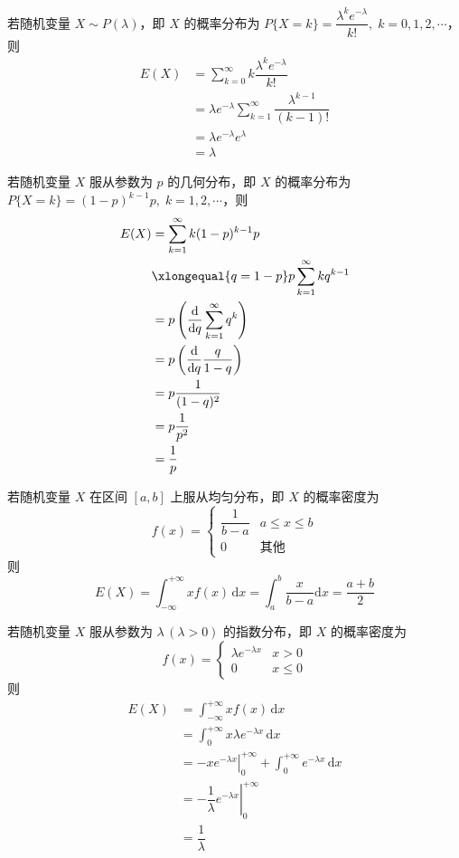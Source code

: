 若随机变量 $X \sim P(\lambda)$，即 $X$ 的概率分布为 $P\{X=k\} = \dfrac{\lambda^k e^{-\lambda}}{k!}, \; k=0,1,2,\cdots$，则
$$
\begin{aligned}
    E(X) &= \sum_{k=0}^{\infty} k \dfrac{\lambda^k e^{-\lambda}}{k!} \\
    &= \lambda e^{-\lambda} \sum_{k=1}^{\infty} \dfrac{\lambda^{k-1}}{(k-1)!} \\
    &= \lambda e^{-\lambda} e^{\lambda} \\
    &= \lambda
\end{aligned}
$$

若随机变量 $X$ 服从参数为 $p$ 的几何分布，即 $X$ 的概率分布为 $P\{X=k\} = (1-p)^{k-1} p, \; k=1,2,\cdots$，则
$$
\begin{aligned}
    E(X) &= \sum_{k=1}^{\infty} k (1-p)^{k-1} p \\
    & \xlongequal{q=1-p} p \sum_{k=1}^{\infty} k q^{k-1} \\
    &= p \left( \dfrac{\text{d}}{\text{d}q} \sum_{k=1}^{\infty} q^k \right) \\
    &= p \left( \dfrac{\text{d}}{\text{d}q} \dfrac{q}{1-q} \right) \\
    &= p \dfrac{1}{(1-q)^2} \\
    &= p \dfrac{1}{p^2} \\
    &= \dfrac{1}{p}
\end{aligned}
$$

若随机变量 $X$ 在区间 $[a,b]$ 上服从均匀分布，即 $X$ 的概率密度为
$$
f(x) = \begin{cases}
    \dfrac{1}{b-a} & a \leqslant x \leqslant b \\[0.5em]
    0 & \text{其他}
\end{cases}
$$
则
$$
E(X) = \int_{-\infty}^{+\infty} x f(x) \, \text{d}x = \int_a^b \dfrac{x}{b-a} \text{d}x = \dfrac{a+b}{2}
$$

若随机变量 $X$ 服从参数为 $\lambda \, (\lambda>0)$ 的指数分布，即 $X$ 的概率密度为
$$
f(x) = \begin{cases}
    \lambda e^{-\lambda x} & x>0 \\
    0 & x \leqslant 0
\end{cases}
$$
则
$$
\begin{aligned}
    E(X) &= \int_{-\infty}^{+\infty} x f(x) \, \text{d}x \\
    &= \int_0^{+\infty} x \lambda e^{-\lambda x} \, \text{d}x \\
    &= \left. -xe^{-\lambda x} \right|_0^{+\infty} + \int_0^{+\infty} e^{-\lambda x} \, \text{d}x \\
    &= \left. -\dfrac{1}{\lambda} e^{-\lambda x} \right|_0^{+\infty} \\
    &= \dfrac{1}{\lambda}
\end{aligned}
$$

